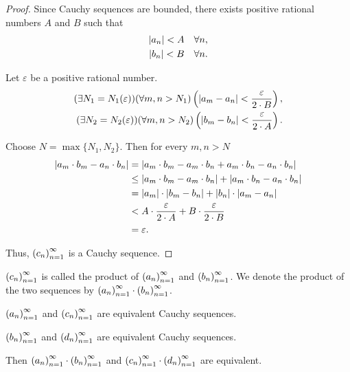\begin{proof}
    Since Cauchy sequences are bounded, there exists positive rational numbers $A$ and $B$ such that
    \[
        \begin{split}
            \left\vert{a_{n}}\right\vert < A\quad\forall n, \\
            \left\vert{b_{n}}\right\vert < B\quad\forall n.
        \end{split}
    \]

    Let $\varepsilon$ be a positive rational number.
    \[
        \begin{split}
            (\exists N_{1}=N_{1}(\varepsilon))(\forall m, n > N_{1})\left(\left\vert{a_{m} - a_{n}}\right\vert < \frac{\varepsilon}{2\cdot B}\right), \\
            (\exists N_{2}=N_{2}(\varepsilon))(\forall m, n > N_{2})\left(\left\vert{b_{m} - b_{n}}\right\vert < \frac{\varepsilon}{2\cdot A}\right).
        \end{split}
    \]

    Choose $N = \max\{ N_{1}, N_{2} \}$. Then for every $m, n > N$
    \begin{align*}
        \left\vert{a_{m}\cdot b_{m} - a_{n}\cdot b_{n}}\right\vert & = \left\vert{a_{m}\cdot b_{m} - a_{m}\cdot b_{n} + a_{m}\cdot b_{n} - a_{n}\cdot b_{n}}\right\vert         \\
                                                  & \le \left\vert{a_{m}\cdot b_{m} - a_{m}\cdot b_{n}}\right\vert + \left\vert{a_{m}\cdot b_{n} - a_{n}\cdot b_{n}}\right\vert \\
                                                  & = \left\vert{a_{m}}\right\vert\cdot\left\vert{b_{m} - b_{n}}\right\vert + \left\vert{b_{n}}\right\vert\cdot\left\vert{a_{m} - a_{n}}\right\vert               \\
                                                  & < A\cdot\frac{\varepsilon}{2\cdot A} + B\cdot\frac{\varepsilon}{2\cdot B}                 \\
                                                  & = \varepsilon.
    \end{align*}

    Thus, ${\left({c_{n}}\right)}^{\infty}_{n=1}$ is a Cauchy sequence.
\end{proof}

${\left({c_{n}}\right)}^{\infty}_{n=1}$ is called the product of ${\left({a_{n}}\right)}^{\infty}_{n=1}$ and ${\left({b_{n}}\right)}^{\infty}_{n=1}$. We denote the product of the two sequences by ${\left({a_{n}}\right)}^{\infty}_{n=1}\cdot{\left({b_{n}}\right)}^{\infty}_{n=1}$.

\begin{theorem}
    ${\left({a_{n}}\right)}^{\infty}_{n=1}$ and ${\left({c_{n}}\right)}^{\infty}_{n=1}$ are equivalent Cauchy sequences.

    ${\left({b_{n}}\right)}^{\infty}_{n=1}$ and ${\left({d_{n}}\right)}^{\infty}_{n=1}$ are equivalent Cauchy sequences.

    Then ${\left({a_{n}}\right)}^{\infty}_{n=1}\cdot{\left({b_{n}}\right)}^{\infty}_{n=1}$ and ${\left({c_{n}}\right)}^{\infty}_{n=1}\cdot{\left({d_{n}}\right)}^{\infty}_{n=1}$ are equivalent.
\end{theorem}

